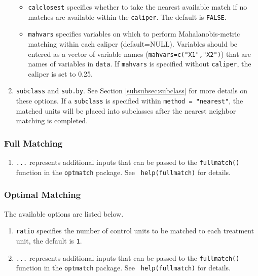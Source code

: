 \documentclass[oneside,letterpaper,titlepage]{article}
\begin{document}
\begin{enumerate}
\begin{itemize}
  \item \texttt{calclosest} specifies whether to take the nearest
    available match if no matches are available within the
    \texttt{caliper}. The default is {\tt FALSE}.
  \item \texttt{mahvars} specifies variables on which to perform
    Mahalanobis-metric matching within each caliper (default=NULL).
    Variables should be entered as a vector of variable names
    (\texttt{mahvars=c("X1","X2")}) that are names of variables in
    \texttt{data}.  If \texttt{mahvars} is specified without
    \texttt{caliper}, the caliper is set to 0.25.
  \end{itemize}
\item \texttt{subclass} and \texttt{sub.by}.  See Section
  \ref{subsubsec:subclass} for more details on these options.  If a
  \texttt{subclass} is specified within \texttt{method = "nearest"},
  the matched units will be placed into subclasses after the nearest
  neighbor matching is completed.
\end{enumerate}


\subsubsection{Full Matching}
\label{subsubsec:inputs-full}

\begin{enumerate}
\item {\tt ...} represents additional inputs that can be passed to the
  {\tt fullmatch()} function in the {\tt optmatch} package. See {\tt
    help(fullmatch)} for details.
\end{enumerate}

\subsubsection{Optimal Matching}
\label{subsubsec:inputs-optimal}

The available options are listed below.
\begin{enumerate}
\item {\tt ratio} specifies the number of control units to be matched
  to each treatment unit, the default is {\tt 1}.
\item {\tt ...} represents additional inputs that can be passed to the
  {\tt fullmatch()} function in the {\tt optmatch} package. See {\tt
    help(fullmatch)} for details.
\end{enumerate}
\end{document}

